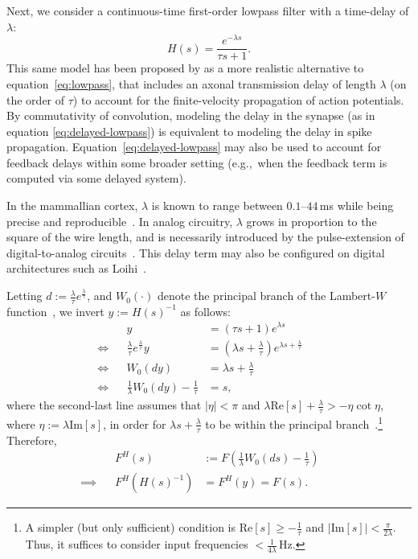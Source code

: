 Next, we consider a continuous-time first-order lowpass filter with a time-delay of $\lambda$:
\begin{equation} \label{eq:delayed-lowpass}
H(s) = \frac{e^{-\lambda s}}{\tau s + 1} \text{.}
\end{equation}
This same model has been proposed by \citet[][equation~6.2]{roth2009modeling} as a more realistic alternative to equation~\ref{eq:lowpass}, that includes an axonal transmission delay of length $\lambda$ (on the order of $\tau$) to account for the finite-velocity propagation of action potentials.
By commutativity of convolution, modeling the delay in the synapse (as in equation \ref{eq:delayed-lowpass}) is equivalent to modeling the delay in spike propagation.
Equation~\ref{eq:delayed-lowpass} may also be used to account for feedback delays within some broader setting (e.g.,~when the feedback term is computed via some delayed system).

In the mammallian cortex, $\lambda$ is known to range between $0.1$--$44$\,ms while being precise and reproducible~\citep{lagorce2015stick}.
In analog circuitry, $\lambda$ grows in proportion to the square of the wire length, and is necessarily introduced by the pulse-extension of digital-to-analog circuits~\citep{voelker2017iscas}.
This delay term may also be configured on digital architectures such as Loihi~\citep{davies2018loihi}.

Letting $d := \frac{\lambda}{\tau}e^{\frac{\lambda}{\tau}}$, and $W_0(\cdot)$ denote the principal branch of the Lambert-$W$ function~\citep{corless1996lambertw}, we invert $y := H(s)^{-1}$ as follows:
\begin{align*}
&& y &= \left(\tau s + 1\right) e^{\lambda s} && \\
\iff && \frac{\lambda}{\tau}e^{\frac{\lambda}{\tau}} y &= \left( \lambda s + \frac{\lambda}{\tau} \right) e^{\lambda s + \frac{\lambda}{\tau}} && \\
\iff && W_0(dy) &= \lambda s + \frac{\lambda}{\tau} && \\
\iff && \frac{1}{\lambda} W_0(dy) - \frac{1}{\tau} &= s \text{,} &&
\end{align*}
where the second-last line assumes that $|\eta| < \pi$ and $\lambda \text{Re}\left[ s \right] + \frac{\lambda}{\tau} > - \eta \cot \eta$, where $\eta := \lambda \text{Im}\left[ s \right]$, in order for $\lambda s + \frac{\lambda}{\tau}$ to be within the principal branch~\citep[][equation~4.4]{corless1996lambertw}.\footnote{
A simpler (but only sufficient) condition is $\text{Re} \left[ s \right] \ge -\frac{1}{\tau}$ and $ | \text{Im} \left[ s \right] | < \frac{\pi}{2 \lambda}$.
Thus, it suffices to consider input frequencies $< \frac{1}{4\lambda}$\,Hz.}
Therefore,
\begin{align}
&& F^H(s) &:= F\left( \frac{1}{\lambda} W_0(ds) - \frac{1}{\tau} \right) \label{eq:delayed-lowpass-mapped} && \\
\implies && F^H(H(s)^{-1}) &= F^H(y) = F(s) \text{.} && \nonumber
\end{align}

